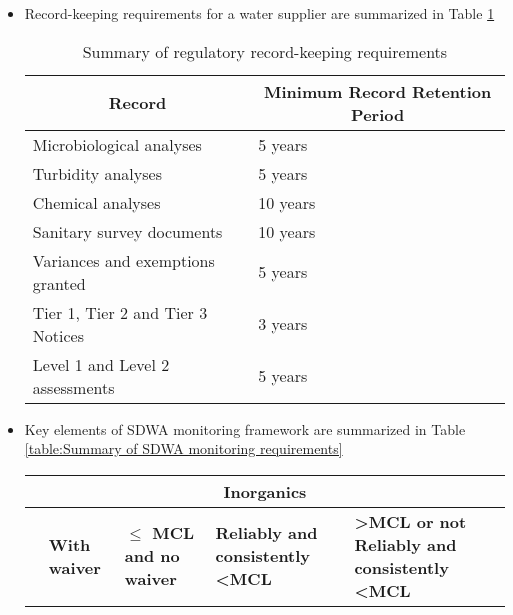 \begin{itemize}
\item Record-keeping requirements for a water supplier are summarized in Table \ref{table:Summary of regulatory record-keeping requirements} \\
\begin{table}[h!]
\begin{center}
\begin{tabular}{|l|l|}
\hline
\multicolumn{1}{|c|}{\textbf{Record}} & \multicolumn{1}{c|}{\textbf{Minimum Record   Retention Period}} \\ \hline
Microbiological   analyses            & 5 years                                                         \\ \hline
Turbidity   analyses                  & 5 years                                                         \\ \hline
Chemical   analyses                   & 10 years                                                        \\ \hline
Sanitary   survey documents           & 10 years                                                        \\ \hline
Variances and   exemptions granted    & 5 years                                                         \\ \hline
Tier 1, Tier 2   and Tier 3 Notices   & 3 years                                                         \\ \hline
Level 1 and   Level 2 assessments     & 5 years                                                         \\ \hline
\end{tabular}
\caption{Summary of regulatory record-keeping requirements} \label{table:Summary of regulatory record-keeping requirements}
\end{center}
\end{table}

\item Key elements of SDWA monitoring framework are summarized in Table \ref{table:Summary of SDWA monitoring requirements}
\begin{table}[]


\begin{tabular}{p{2cm}p{2.5cm}p{2.5cm}p{2.5cm}p{2.5cm}|}
\hline
\multicolumn{5}{|c|}{\textbf{Inorganics}}                                                                                                                                                                                                                                                                             
 \\ \hline
\multicolumn{1}{|p{2.5cm}|}{} & 
\multicolumn{1}{p{2.5cm}|}{\textbf{With waiver}} & 
\multicolumn{1}{p{2.5cm}|}{\textbf{$\le$ MCL and no waiver}} & 
\multicolumn{1}{p{2.5cm}|}{\textbf{Reliably   and consistently \textless MCL}} & 
\multicolumn{1}{p{2.5cm}|}{\textbf{\textgreater   MCL or not Reliably and consistently \textless MCL}} 
\\ \hline


\end{tabular}
\end{table}
\end{itemize}
